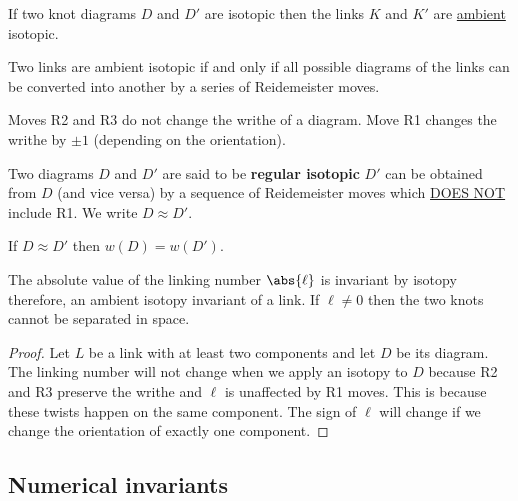 \documentclass[12pt, a4paper]{article}
\begin{document}
\begin{corollary}
    If two knot diagrams \(D\) and \(D'\) are isotopic then the links \(K\) and \(K'\) are \underline{ambient} isotopic.
\end{corollary}

\begin{mdthm}
    Two links are ambient isotopic if and only if all possible diagrams of the links can be converted into another by a series of Reidemeister moves.
\end{mdthm}

\begin{mdlemma}
    Moves R2 and R3 do not change the writhe of a diagram. Move R1 changes the writhe by \(\pm 1\) (depending on the orientation).
\end{mdlemma}

\begin{definition}
    Two diagrams \(D\) and \(D'\) are said to be \textbf{regular isotopic} \(D'\) can be obtained from \(D\) (and vice versa) by a sequence of Reidemeister moves which \ul{DOES NOT} include R1. We write \(D \approx D'\).
\end{definition}

\begin{corollary}
    If \(D \approx D'\) then \(w(D)=w(D')\).
\end{corollary}

\begin{mdcor}
    The absolute value of the linking number \(\abs{\ell}\) is invariant by isotopy therefore, an ambient isotopy invariant of a link. If \(\ell \neq 0\) then the two knots cannot be separated in space.
\end{mdcor}

\begin{proof}
    Let \(L\) be a link with at least two components and let \(D\) be its diagram. The linking number will not change when we apply an isotopy to \(D\) because R2 and R3 preserve the writhe and \(\ell\) is unaffected by R1 moves. This is because these twists happen on the same component. The sign of \(\ell\) will change if we change the orientation of exactly one component.
\end{proof}

\subsection{Numerical invariants}
\end{document}
